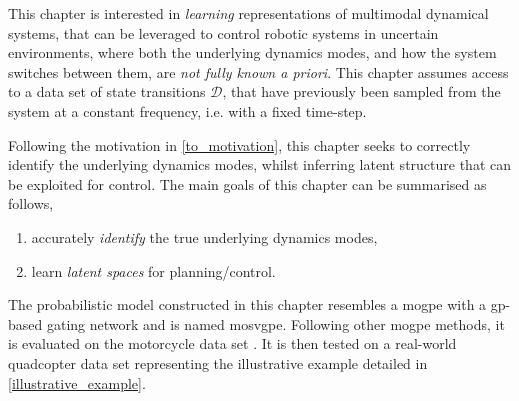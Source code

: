 \documentclass{mimosis-class/mimosis}
\numberwithin{equation}{chapter}
\newcommand{\modeInd}{\ensuremath{k}}
\newcommand{\ModeInd}{\ensuremath{\MakeUppercase{\modeInd}}}
\newcommand{\dataset}{\ensuremath{\mathcal{D}}}
\begin{document}
\newcommand{\expertKL}{\ensuremath{\text{KL}\left( \expertInducingVariational \mid\mid \expertInducingPrior \right)}}
\newcommand{\expertsKL}{\ensuremath{\sum_{\modeInd=1}^\ModeInd\text{KL}\left( \expertInducingVariational \mid\mid \expertInducingPrior \right)}}
\newcommand{\gatingKL}{\ensuremath{\text{KL}\left( \gatingInducingVariational \mid\mid \gatingInducingPrior \right)}}
\newcommand{\gatingsKL}{\ensuremath{\sum_{\modeInd=1}^\ModeInd \text{KL}\left( \gatingInducingVariational \mid\mid \gatingInducingPrior \right)}}
This chapter is interested in \emph{learning} representations of multimodal dynamical systems,
that can be leveraged to control robotic systems in uncertain environments, where both the underlying
dynamics modes, and how the system switches between them, are \emph{not fully known a priori}.
This chapter assumes access to a data set of state transitions \(\dataset\), that
have previously been sampled from the system at a constant frequency, i.e. with a fixed time-step.

Following the motivation in \cref{to_motivation}, this chapter
seeks to correctly identify the underlying dynamics modes, whilst inferring
latent structure that can be exploited for control.
The main goals of this chapter can be summarised as follows,
\begin{enumerate}
\item accurately \emph{identify} the true underlying dynamics modes,
\item learn \emph{latent spaces} for planning/control.
\end{enumerate}
The probabilistic model constructed in this chapter
resembles a \acrfull{mogpe} with a \acrshort{gp}-based gating network and  is named \acrfull{mosvgpe}.
Following other \acrshort{mogpe} methods, it is evaluated on the motorcycle data set \citep{Silverman1985}.
It is then tested on a real-world quadcopter data set representing the illustrative
example detailed in \cref{illustrative_example}.
\end{document}
